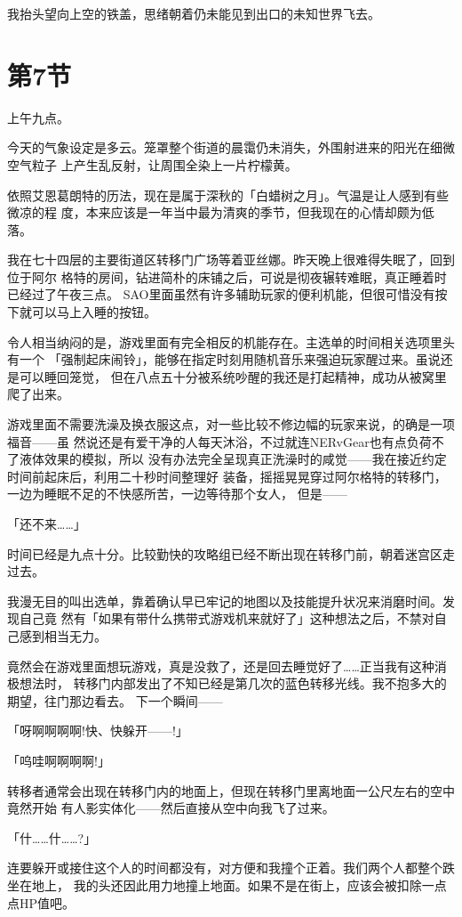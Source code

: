 \documentclass[11pt]{book}
\begin{document}
我抬头望向上空的铁盖，思绪朝着仍未能见到出口的未知世界飞去。
\section{第7节}
\label{sec:org93eb388}
上午九点。

今天的气象设定是多云。笼罩整个街道的晨霭仍未消失，外围射进来的阳光在细微空气粒子
上产生乱反射，让周围全染上一片柠檬黄。

依照艾恩葛朗特的历法，现在是属于深秋的「白蜡树之月」。气温是让人感到有些微凉的程
度，本来应该是一年当中最为清爽的季节，但我现在的心情却颇为低落。

我在七十四层的主要街道区转移门广场等着亚丝娜。昨天晚上很难得失眠了，回到位于阿尔
格特的房间，钻进简朴的床铺之后，可说是彻夜辗转难眠，真正睡着时已经过了午夜三点。
SAO里面虽然有许多辅助玩家的便利机能，但很可惜没有按下就可以马上入睡的按钮。

令人相当纳闷的是，游戏里面有完全相反的机能存在。主选单的时间相关选项里头有一个
「强制起床闹铃」，能够在指定时刻用随机音乐来强迫玩家醒过来。虽说还是可以睡回笼觉，
但在八点五十分被系统吵醒的我还是打起精神，成功从被窝里爬了出来。

游戏里面不需要洗澡及换衣服这点，对一些比较不修边幅的玩家来说，的确是一项福音——虽
然说还是有爱干净的人每天沐浴，不过就连NERvGear也有点负荷不了液体效果的模拟，所以
没有办法完全呈现真正洗澡时的咸觉——我在接近约定时间前起床后，利用二十秒时间整理好
装备，摇摇晃晃穿过阿尔格特的转移门，一边为睡眠不足的不快感所苦，一边等待那个女人，
但是——

「还不来……」

时间已经是九点十分。比较勤快的攻略组已经不断出现在转移门前，朝着迷宫区走过去。

我漫无目的叫出选单，靠着确认早已牢记的地图以及技能提升状况来消磨时间。发现自己竟
然有「如果有带什么携带式游戏机来就好了」这种想法之后，不禁对自己感到相当无力。

竟然会在游戏里面想玩游戏，真是没救了，还是回去睡觉好了……正当我有这种消极想法时，
转移门内部发出了不知已经是第几次的蓝色转移光线。我不抱多大的期望，往门那边看去。
下一个瞬间——

「呀啊啊啊啊!快、快躲开——!」

「呜哇啊啊啊啊!」

转移者通常会出现在转移门内的地面上，但现在转移门里离地面一公尺左右的空中竟然开始
有人影实体化——然后直接从空中向我飞了过来。

「什……什……?」

连要躲开或接住这个人的时间都没有，对方便和我撞个正着。我们两个人都整个跌坐在地上，
我的头还因此用力地撞上地面。如果不是在街上，应该会被扣除一点点HP值吧。
\end{document}
